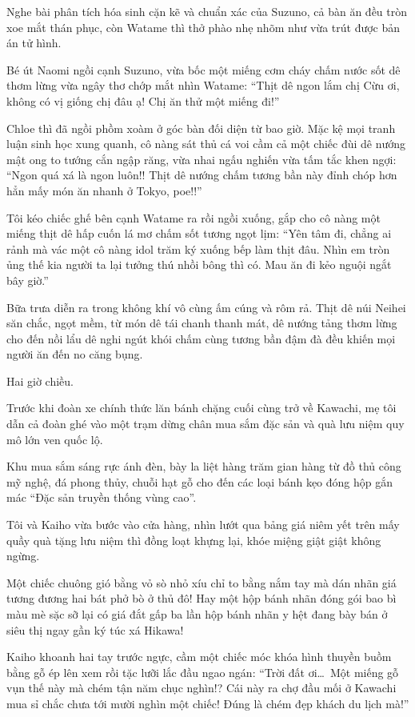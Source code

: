 \documentclass[../main.tex]{subfiles}
\begin{document}
Nghe bài phân tích hóa sinh cặn kẽ và chuẩn xác của Suzuno, cả bàn ăn đều tròn xoe mắt thán phục, còn Watame thì thở phào nhẹ nhõm như vừa trút được bản án tử hình.

Bé út Naomi ngồi cạnh Suzuno, vừa bốc một miếng cơm cháy chấm nước sốt dê thơm lừng vừa ngây thơ chớp mắt nhìn Watame: ``Thịt dê ngon lắm chị Cừu ơi, không có vị giống chị đâu ạ! Chị ăn thử một miếng đi!''

Chloe thì đã ngồi phồm xoàm ở góc bàn đối diện từ bao giờ. Mặc kệ mọi tranh luận sinh học xung quanh, cô nàng sát thủ cá voi cầm cả một chiếc đùi dê nướng mật ong to tướng cắn ngập răng, vừa nhai ngấu nghiến vừa tấm tắc khen ngợi: ``Ngon quá xá là ngon luôn!! Thịt dê nướng chấm tương bần này đỉnh chóp hơn hẳn mấy món ăn nhanh ở Tokyo, poe!!''

Tôi kéo chiếc ghế bên cạnh Watame ra rồi ngồi xuống, gắp cho cô nàng một miếng thịt dê hấp cuốn lá mơ chấm sốt tương ngọt lịm: ``Yên tâm đi, chẳng ai rảnh mà vác một cô nàng idol trăm ký xuống bếp làm thịt đâu. Nhìn em tròn ủng thế kia người ta lại tưởng thú nhồi bông thì có. Mau ăn đi kẻo nguội ngắt bây giờ.''

Bữa trưa diễn ra trong không khí vô cùng ấm cúng và rôm rả. Thịt dê núi Neihei săn chắc, ngọt mềm, từ món dê tái chanh thanh mát, dê nướng tảng thơm lừng cho đến nồi lẩu dê nghi ngút khói chấm cùng tương bần đậm đà đều khiến mọi người ăn đến no căng bụng.

\ct

Hai giờ chiều.

Trước khi đoàn xe chính thức lăn bánh chặng cuối cùng trở về Kawachi, mẹ tôi dẫn cả đoàn ghé vào một trạm dừng chân mua sắm đặc sản và quà lưu niệm quy mô lớn ven quốc lộ.

Khu mua sắm sáng rực ánh đèn, bày la liệt hàng trăm gian hàng từ đồ thủ công mỹ nghệ, đá phong thủy, chuỗi hạt gỗ cho đến các loại bánh kẹo đóng hộp gắn mác ``Đặc sản truyền thống vùng cao''.

Tôi và Kaiho vừa bước vào cửa hàng, nhìn lướt qua bảng giá niêm yết trên mấy quầy quà tặng lưu niệm thì đồng loạt khựng lại, khóe miệng giật giật không ngừng.

Một chiếc chuông gió bằng vỏ sò nhỏ xíu chỉ to bằng nắm tay mà dán nhãn giá tương đương hai bát phở bò ở thủ đô! Hay một hộp bánh nhãn đóng gói bao bì màu mè sặc sỡ lại có giá đắt gấp ba lần hộp bánh nhãn y hệt đang bày bán ở siêu thị ngay gần ký túc xá Hikawa!

Kaiho khoanh hai tay trước ngực, cầm một chiếc móc khóa hình thuyền buồm bằng gỗ ép lên xem rồi tặc lưỡi lắc đầu ngao ngán: ``Trời đất ơi\dots\ Một miếng gỗ vụn thế này mà chém tận năm chục nghìn!? Cái này ra chợ đầu mối ở Kawachi mua sỉ chắc chưa tới mười nghìn một chiếc! Đúng là chém đẹp khách du lịch mà!''
\end{document}
